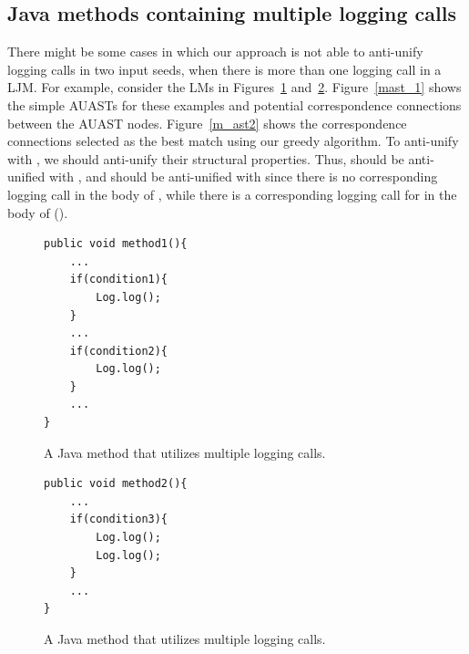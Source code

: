 

\subsection{Java methods containing multiple logging calls} \label{meth-multipleLogs}
There might be some cases in which our approach is not able to anti-unify logging calls in two input seeds, when there is more than one logging call in a LJM. For example, consider the LMs in Figures~\ref{multiple1} and~\ref{multiple2}. Figure~\ref{mast_1} shows the simple AUASTs for these examples and potential correspondence connections between the AUAST nodes. Figure~\ref{m_ast2} shows the correspondence connections selected as the best match using our greedy algorithm. To anti-unify  with , we should anti-unify their structural properties. Thus,  should be anti-unified with , and  should be anti-unified with \NIL{} since there is no corresponding logging call in the body of , while there is a corresponding logging call for  in the body of  ().


\begin{figure}[H]
\def\baselinestretch{1}
\begin{lstlisting}
public void method1(){
	...
	if(condition1){
		Log.log();
	}
	...
	if(condition2){
		Log.log();
	}
	...
}
\end{lstlisting}
\caption{A Java method that utilizes multiple logging calls.\label{multiple1}}
\end{figure}



\begin{figure}[H]
\def\baselinestretch{1}
\begin{lstlisting}
public void method2(){
	...
	if(condition3){
		Log.log();
		Log.log();
	}
	...
}
\end{lstlisting}
\caption{A Java method that utilizes multiple logging calls.\label{multiple2}}
\end{figure}

